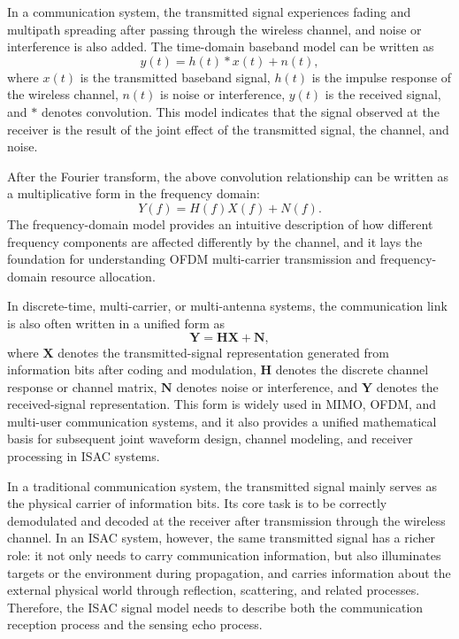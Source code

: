 
In a communication system,
the transmitted signal experiences fading and multipath spreading after passing through the wireless channel,
and noise or interference is also added.
The time-domain baseband model can be written as
\begin{equation}
    y(t) = h(t) * x(t) + n(t),
    \label{eq:comm_time_domain_model}
\end{equation}
where \(x(t)\) is the transmitted baseband signal,
\(h(t)\) is the impulse response of the wireless channel,
\(n(t)\) is noise or interference,
\(y(t)\) is the received signal,
and \(*\) denotes convolution.
This model indicates that the signal observed at the receiver is the result of the joint effect
of the transmitted signal,
the channel,
and noise.

After the Fourier transform,
the above convolution relationship can be written as a multiplicative form in the frequency domain:
\begin{equation}
    Y(f) = H(f)X(f) + N(f).
    \label{eq:comm_frequency_domain_model}
\end{equation}
The frequency-domain model provides an intuitive description of how different frequency components
are affected differently by the channel,
and it lays the foundation for understanding OFDM multi-carrier transmission
and frequency-domain resource allocation.

In discrete-time,
multi-carrier,
or multi-antenna systems,
the communication link is also often written in a unified form as
\begin{equation}
    \mathbf{Y} = \mathbf{H}\mathbf{X} + \mathbf{N},
    \label{eq:comm_matrix_model}
\end{equation}
where \(\mathbf{X}\) denotes the transmitted-signal representation generated from information bits
after coding and modulation,
\(\mathbf{H}\) denotes the discrete channel response or channel matrix,
\(\mathbf{N}\) denotes noise or interference,
and \(\mathbf{Y}\) denotes the received-signal representation.
This form is widely used in MIMO,
OFDM,
and multi-user communication systems,
and it also provides a unified mathematical basis for subsequent joint waveform design,
channel modeling,
and receiver processing in ISAC systems.


In a traditional communication system,
the transmitted signal mainly serves as the physical carrier of information bits.
Its core task is to be correctly demodulated and decoded at the receiver
after transmission through the wireless channel.
In an ISAC system,
however,
the same transmitted signal has a richer role:
it not only needs to carry communication information,
but also illuminates targets or the environment during propagation,
and carries information about the external physical world through reflection,
scattering,
and related processes.
Therefore,
the ISAC signal model needs to describe both the communication reception process
and the sensing echo process.

